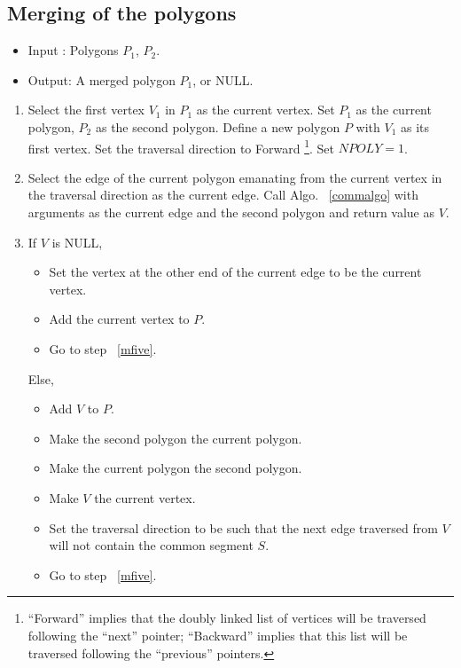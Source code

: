 	\subsection{Merging of the polygons}
	\label{mergalgo}

		\begin{itemize}
		\item
		Input : Polygons $P_{1}$, $P_{2}$.
		\item
		Output:	A merged polygon $P_{1}$, or NULL.
		\end{itemize}

		\begin{enumerate}

		\item
		\label{mone}
		Select the first vertex $V_{1}$ in $P_{1}$ as the current vertex.
		Set $P_{1}$ as the current polygon, $P_{2}$ as the second polygon.
		Define a new polygon $P$ with $V_{1}$ as its first vertex. Set
		the traversal direction to Forward \footnote{``Forward'' implies
		that the doubly linked list of vertices will be traversed following
		the ``next'' pointer; ``Backward'' implies that this list will be 
		traversed following the ``previous'' pointers. }.
		Set $NPOLY = 1 $.

		\item
		\label{mtwo}
		Select the edge of the current polygon 
		emanating from the current vertex in the traversal direction as the 
		current edge. Call Algo. ~\ref{commalgo} with arguments as the
		current edge and the second polygon and return value as $V$.
		
		\item
		\label{mthree}
		If $V$ is NULL,
			\begin{itemize}
			\item
			Set the vertex at the other end of the current edge to be the 
			current vertex. 
			\item
			Add the current vertex to $P$. 
			\item
			Go to step ~\ref{mfive}. 
			\end{itemize}
		Else,
			\begin{itemize}
			\item
			Add $V$ to $P$. 
			\item
			Make the second polygon the current polygon. 
			\item
			Make the current polygon the second polygon. 
			\item
			Make $V$ the current vertex.
			\item
			Set the traversal direction to be such that the next edge traversed
			from $V$ will not contain the common segment $S$. 
			\item
			Go to step ~\ref{mfive}.
			\end{itemize}


\end{enumerate}
